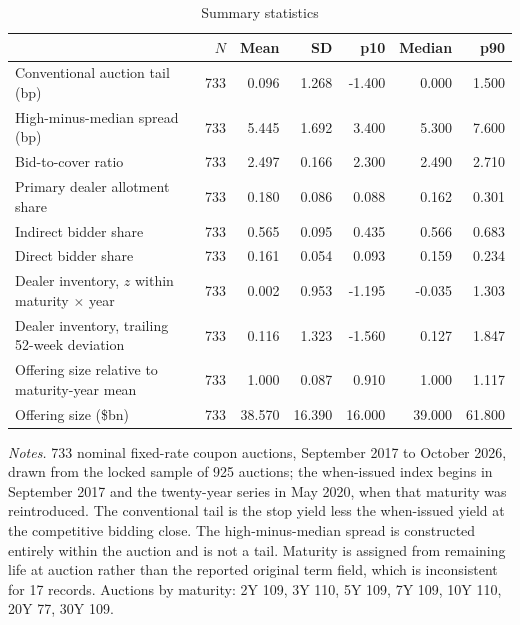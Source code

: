 \begin{table}[htbp]\centering
\caption{Summary statistics}
\label{tab:summary}
\footnotesize
\begin{tabular}{lrrrrrr}
\toprule
& $N$ & Mean & SD & p10 & Median & p90 \\
\midrule
Conventional auction tail (bp) & 733 & 0.096 & 1.268 & -1.400 & 0.000 & 1.500 \\
High-minus-median spread (bp) & 733 & 5.445 & 1.692 & 3.400 & 5.300 & 7.600 \\
Bid-to-cover ratio & 733 & 2.497 & 0.166 & 2.300 & 2.490 & 2.710 \\
Primary dealer allotment share & 733 & 0.180 & 0.086 & 0.088 & 0.162 & 0.301 \\
Indirect bidder share & 733 & 0.565 & 0.095 & 0.435 & 0.566 & 0.683 \\
Direct bidder share & 733 & 0.161 & 0.054 & 0.093 & 0.159 & 0.234 \\
Dealer inventory, $z$ within maturity $\times$ year & 733 & 0.002 & 0.953 & -1.195 & -0.035 & 1.303 \\
Dealer inventory, trailing 52-week deviation & 733 & 0.116 & 1.323 & -1.560 & 0.127 & 1.847 \\
Offering size relative to maturity-year mean & 733 & 1.000 & 0.087 & 0.910 & 1.000 & 1.117 \\
Offering size (\$bn) & 733 & 38.570 & 16.390 & 16.000 & 39.000 & 61.800 \\
\bottomrule
\end{tabular}
\begin{minipage}{0.95\textwidth}\vspace{4pt}\scriptsize
\emph{Notes.} 733 nominal fixed-rate coupon auctions, September 2017 to October 2026, drawn from the locked sample of 925 auctions; the when-issued index begins in September 2017 and the twenty-year series in May 2020, when that maturity was reintroduced. The conventional tail is the stop yield less the when-issued yield at the competitive bidding close. The high-minus-median spread is constructed entirely within the auction and is not a tail. Maturity is assigned from remaining life at auction rather than the reported original term field, which is inconsistent for 17 records. Auctions by maturity: 2Y 109, 3Y 110, 5Y 109, 7Y 109, 10Y 110, 20Y 77, 30Y 109.
\end{minipage}
\end{table}
